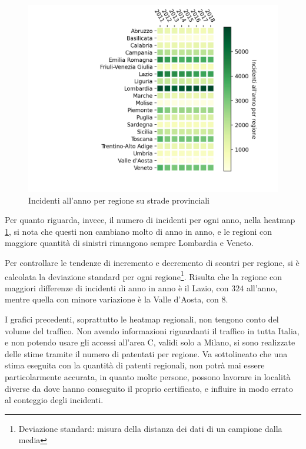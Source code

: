 \documentclass[a4paper,12pt]{report}
\begin{document}
\begin{figure}
    \includegraphics[width=\linewidth]{../src/incidenti/incidenti_aci/mappe_regioni/regioni_heatmap.png}
    \caption{Incidenti all'anno per regione su strade provinciali}
    \label{fig:regione-heatmap}
\end{figure}

Per quanto riguarda, invece, il numero di incidenti per ogni anno, 
nella heatmap \ref{fig:regione-heatmap}, 
si nota che questi non cambiano molto di anno in anno, e le regioni con maggiore quantità 
di sinistri rimangono sempre Lombardia e Veneto.

Per controllare le tendenze di incremento e decremento di scontri per regione, 
si è calcolata la deviazione standard per ogni regione\footnote{Deviazione standard: 
misura della distanza dei dati di un campione dalla media\cite{PROB_E_STATISTICA:2}}.
Risulta che la regione con maggiori differenze di incidenti di anno in anno 
è il Lazio, con $324$ all'anno, mentre quella con minore 
variazione è la Valle d'Aosta, con $8$.

I grafici precedenti, soprattutto le heatmap regionali, non tengono conto del 
volume del traffico.
Non avendo informazioni riguardanti il traffico in tutta Italia, 
e non potendo usare gli accessi all'area C, validi solo a Milano, si sono realizzate 
delle stime tramite il numero di patentati per regione.
Va sottolineato che una stima eseguita con la quantità di patenti regionali, 
non potrà mai essere particolarmente accurata, in quanto molte persone, possono 
lavorare in località diverse da dove hanno conseguito il proprio certificato, 
e influire in modo errato al conteggio degli incidenti. 
\end{document}
